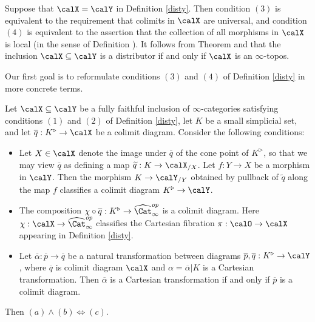 \begin{example}\label{jina}
Suppose that $\calX = \calY$ in Definition \ref{disty}. Then condition $(3)$ is equivalent to the requirement that colimits in $\calX$ are universal, and condition $(4)$ is equivalent to the assertion that the collection of all morphisms in $\calX$ is local (in the sense of Definition ). It follows from Theorem  and  that the inclusion $\calX \subseteq \calY$ is a distributor if and only if $\calX$ is an $\infty$-topos.
\end{example}

Our first goal is to reformulate conditions $(3)$ and $(4)$ of Definition \ref{disty} in more concrete terms.

\begin{proposition}\label{maid}
Let $\calX \subseteq \calY$ be a fully faithful inclusion of $\infty$-categories satisfying conditions
$(1)$ and $(2)$ of Definition \ref{disty}, let $K$ be a small simplicial set, and let
$\overline{q}: K^{\triangleright} \rightarrow \calX$ be a colimit diagram. Consider the following conditions:

\begin{itemize}
\item[$(a)$] Let $X \in \calX$ denote the image under $\overline{q}$ of the cone point
of $K^{\triangleright}$, so that we may view $\overline{q}$ as defining a map
$\widetilde{q}: K \rightarrow \calX_{/X}$. Let $f: Y \rightarrow X$ be a morphism in $\calY$. Then
the morphism $K \rightarrow \calY_{/Y}$ obtained by pullback of $\widetilde{q}$ along the
map $f$ classifies a colimit diagram $K^{\triangleright} \rightarrow \calY$.

\item[$(b)$] The composition $\chi \circ \overline{q}: K^{\triangleright} \rightarrow \widehat{\Cat}_{\infty}^{op}$ is a colimit diagram. Here $\chi: \calX \rightarrow \widehat{\Cat}_{\infty}^{op}$ classifies the
Cartesian fibration $\pi: \calO \rightarrow \calX$ appearing in Definition \ref{disty}. 

\item[$(c)$] Let $\overline{\alpha}: \overline{p} \rightarrow \overline{q}$ be a natural transformation between diagrams $\overline{p}, \overline{q}: K^{\triangleright} \rightarrow \calY$, where
$\overline{q}$ is colimit diagram $\calX$ and $\alpha = \overline{\alpha} | K$ is a Cartesian transformation.
Then $\overline{\alpha}$ is a Cartesian transformation if and only if $\overline{p}$ is a colimit diagram.
\end{itemize}
Then $(a) \wedge (b) \Leftrightarrow (c)$.
\end{proposition}

